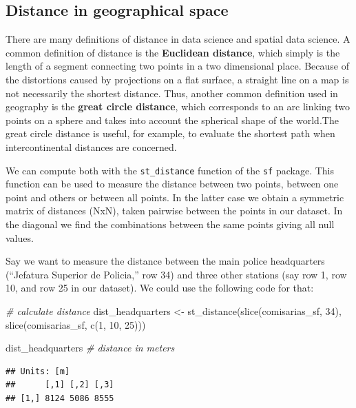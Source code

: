 \documentclass[
  krantz2]{krantz}
\makeatletter
\newenvironment{Shaded}{\begin{snugshade}}{\end{snugshade}}
\newcommand{\CommentTok}[1]{\textcolor[rgb]{0.37,0.37,0.37}{\textit{#1}}}
\newcommand{\DecValTok}[1]{\textcolor[rgb]{0.06,0.06,0.06}{#1}}
\newcommand{\FunctionTok}[1]{\textcolor[rgb]{0,0,0}{#1}}
\newcommand{\NormalTok}[1]{#1}
\newcommand{\OtherTok}[1]{\textcolor[rgb]{0.37,0.37,0.37}{#1}}
\newenvironment{kframe}{%
\medskip{}
\setlength{\fboxsep}{.8em}
 \def\at@end@of@kframe{}%
 \ifinner\ifhmode%
  \def\at@end@of@kframe{\end{minipage}}%
  \begin{minipage}{\columnwidth}%
 \fi\fi%
 \def\FrameCommand##1{\hskip\@totalleftmargin \hskip-\fboxsep
 \colorbox{shadecolor}{##1}\hskip-\fboxsep
     \hskip-\linewidth \hskip-\@totalleftmargin \hskip\columnwidth}%
 \MakeFramed {\advance\hsize-\width
   \@totalleftmargin\z@ \linewidth\hsize
   \@setminipage}}%
 {\par\unskip\endMakeFramed%
 \at@end@of@kframe}
\renewenvironment{Shaded}{\begin{kframe}}{\end{kframe}}
\makeatother
\begin{document}
\hypertarget{distance-in-geographical-space}{%
\subsection{Distance in geographical space}\label{distance-in-geographical-space}}

There are many definitions of distance in data science and spatial data science. A common definition of distance is the \textbf{Euclidean distance}, which simply is the length of a segment connecting two points in a two dimensional place. Because of the distortions caused by projections on a flat surface, a straight line on a map is not necessarily the shortest distance. Thus, another common definition used in geography is the \textbf{great circle distance}, which corresponds to an arc linking two points on a sphere and takes into account the spherical shape of the world.The great circle distance is useful, for example, to evaluate the shortest path when intercontinental distances are concerned.

We can compute both with the \texttt{st\_distance} function of the \texttt{sf} package. This function can be used to measure the distance between two points, between one point and others or between all points. In the latter case we obtain a symmetric matrix of distances (NxN), taken pairwise between the points in our dataset. In the diagonal we find the combinations between the same points giving all null values.

Say we want to measure the distance between the main police headquarters (``Jefatura Superior de Policia,'' row 34) and three other stations (say row 1, row 10, and row 25 in our dataset). We could use the following code for that:

\begin{Shaded}
\begin{Highlighting}[]
\CommentTok{\# calculate distance}
\NormalTok{dist\_headquarters }\OtherTok{\textless{}{-}} \FunctionTok{st\_distance}\NormalTok{(}\FunctionTok{slice}\NormalTok{(comisarias\_sf, }\DecValTok{34}\NormalTok{), }
                              \FunctionTok{slice}\NormalTok{(comisarias\_sf, }\FunctionTok{c}\NormalTok{(}\DecValTok{1}\NormalTok{, }\DecValTok{10}\NormalTok{, }\DecValTok{25}\NormalTok{)))}

\NormalTok{dist\_headquarters }\CommentTok{\# distance in meters}
\end{Highlighting}
\end{Shaded}

\begin{verbatim}
## Units: [m]
##      [,1] [,2] [,3]
## [1,] 8124 5086 8555
\end{verbatim}
\end{document}
